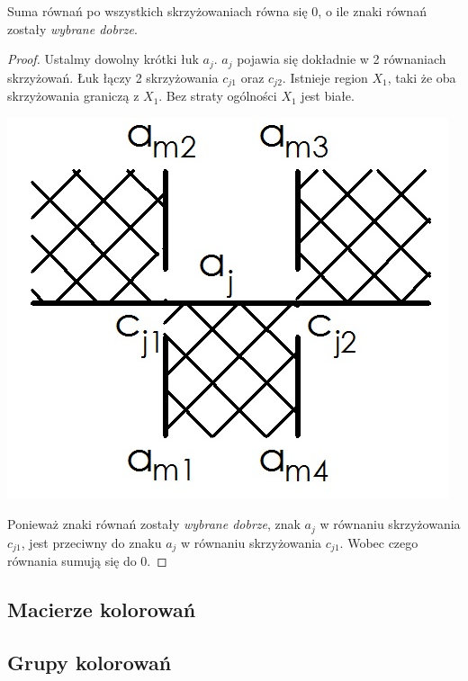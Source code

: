\begin{twierdzenie}
Suma równań po wszystkich skrzyżowaniach równa się 0, o ile znaki równań zostały \emph{wybrane dobrze}.
\end{twierdzenie}
\begin{proof}
Ustalmy dowolny krótki łuk $a_{j}$. $a_{j}$ pojawia się dokładnie w 2 równaniach skrzyżowań. Łuk łączy 2 skrzyżowania $c_{j1}$ oraz $c_{j2}$. Istnieje region $X_{1}$, taki że oba skrzyżowania graniczą z $X_{1}$. Bez straty ogólności $X_{1}$ jest białe. 
\begin{center}
  			\includegraphics[scale=0.3]{2/Obrazy/0sum}
\end{center}
Ponieważ znaki równań zostały  \emph{wybrane dobrze}, znak $a_{j}$ w równaniu skrzyżowania  
$c_{j1}$, jest przeciwny do znaku $a_{j}$ w równaniu skrzyżowania $c_{j1}$. Wobec czego równania sumują się do 0.
\end{proof}


\subsection{Macierze kolorowań}
\subsection{Grupy kolorowań}
